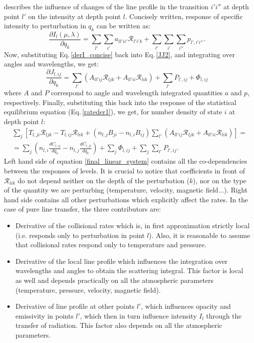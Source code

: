 \documentclass[referee]{aa}
\begin{document}
describes the influence of changes of the line profile in the transition $i'i''$ at depth point $l'$ on the intensity at depth point $l$. Concisely written, response of specific intensity to perturbation in $q_k$ can be written as:
\begin{equation} 
 \frac{\partial I_l(\mu,\lambda)}{\partial q_k} = \sum_{l'} \sum_{i'} a_{ll'ii'} {\mathcal R}_{l'i'k} + \sum_{l'}\sum_{i'}\sum_{i''} p_{l',i'i''}.
 \label{derI_concise}
\end{equation}
Now, substituting Eq.\,\ref{derI_concise} back into Eq.\,\ref{JJ2}, and integrating over angles and wavelengths, we get:
\begin{equation}
 \frac{\partial J_{l,ij}}{\partial q_k} = \sum_{l'} (A_{ll'ij} {\mathcal R}_{ljk}+ A_{ll'ii} {\mathcal R}_{lik}) + \sum_{l'} P_{l',ij} + \Phi_{l,ij}
\end{equation}
where $A$ and $P$ correspond to angle and wavelength integrated quantities $a$ and $p$, respectively. Finally, substituting this back into the response of the statistical equilibrium equation (Eq.\,\ref{rateder1}), we get, for number density of state $i$ at depth point $l$:
\begin{align}
&\sum_j \left [ T_{l,ji}\mathcal{R}_{ljk} - T_{l,ij}\mathcal{R}_{lik} + (n_{l,j}B_{ji} - n_{l,i}B_{ij}) \sum_{l'} (A_{ll'ij} {\mathcal R}_{ljk}+ A_{ll'ii} {\mathcal R}_{lik}) \right ]  = \nonumber \\
& = \sum_j (n_{l,i} \frac{d C_{l,ij}}{d q_k} - n_{l,j} \frac{d C_{l,ji}}{d q_k}) + \sum_j \Phi_{l,ij} + \sum_j \sum_{l'} P_{l',ij}. 
 \label{final_linear_system}
\end{align}
Left hand side of equation \ref{final_linear_system} contains all the co-dependencies between the responses of levels. It is crucial to notice that coefficients in front of $\mathcal R_{lik}$ do not depend neither on the depth of the perturbation ($k$), nor on the type of the quantity we are perturbing (temperature, velocity, magnetic field...). Right hand side contains all other perturbations which explicitly affect the rates. In the case of pure line transfer, the three contributors are:
\begin{itemize}
 \item Derivative of the collisional rates which is, in first approximation strictly local (i.e. responds only to perturbation in point $l$). Also, it is reasonable to assume that collisional rates respond only to temperature and pressure.
 \item Derivative of the local line profile which influences the integration over wavelengths and angles to obtain the scattering integral. This factor is local as well and depends practically on all the atmospheric parameters (temperature, pressure, velocity, magnetic field).
 \item Derivative of line profile at other points $l'$, which influences opacity and emissivity in points $l'$, which then in turn influence intensity $I_l$ through the transfer of radiation. This factor also depends on all the atmospheric parameters.
\end{itemize}
\end{document}
